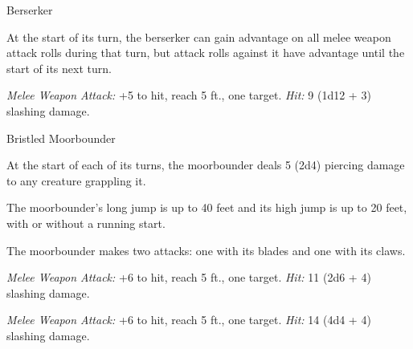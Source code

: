 \documentclass[10pt,a4paper,twoside,bg=none,twocolumn,openany,nodeprecatedcode]{dndbook}
\begin{document}
\begin{DndMonster}[float=t]{Berserker}
\DndMonsterBasics[
armor-class = {13 (hide armor)},
hit-points = {\DndDice{9d8 + 27}},
speed = {30 ft.}
]
\DndMonsterAbilityScores[
 str = 16,
 dex = 12,
 con = 17,
 int = 9,
 wis = 11,
 cha = 9
]
\DndMonsterDetails[
languages = {any one language (usually Common)},
challenge = 2,
]
At the start of its turn, the berserker can gain advantage on all melee weapon attack rolls during that turn, but attack rolls against it have advantage until the start of its next turn.

\par
{}
\textsl{Melee Weapon Attack:} +5 to hit, reach 5 ft., one target. \textsl{Hit:} 9 (1d12 + 3) slashing damage.

\end{DndMonster}



\begin{DndMonster}[float=t]{Bristled Moorbounder}
\DndMonsterBasics[
armor-class = {15 (natural armor)},
hit-points = {\DndDice{7d10 + 14}},
speed = {70 ft.}
]
\DndMonsterAbilityScores[
 str = 18,
 dex = 14,
 con = 14,
 int = 2,
 wis = 13,
 cha = 5
]
\DndMonsterDetails[
senses = {darkvision 60 ft., passive perception 11},
challenge = 3,
]
At the start of each of its turns, the moorbounder deals 5 (2d4) piercing damage to any creature grappling it.

The moorbounder's long jump is up to 40 feet and its high jump is up to 20 feet, with or without a running start.

\par
{}
The moorbounder makes two attacks: one with its blades and one with its claws.

\textsl{Melee Weapon Attack:} +6 to hit, reach 5 ft., one target. \textsl{Hit:} 11 (2d6 + 4) slashing damage.

\textsl{Melee Weapon Attack:} +6 to hit, reach 5 ft., one target. \textsl{Hit:} 14 (4d4 + 4) slashing damage.

\end{DndMonster}
\end{document}
